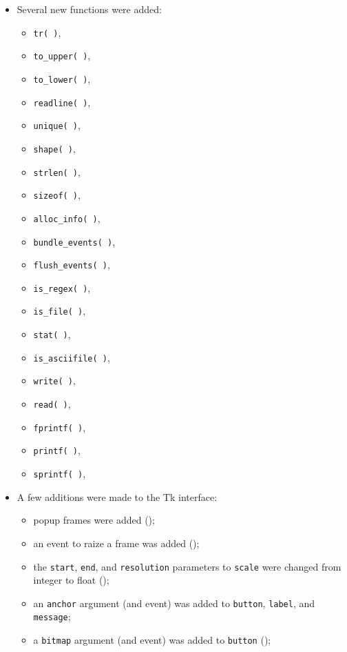 \begin{itemize}
\item Several new functions were added:
\begin{itemize}
\item {\tt tr( )}, 
\item {\tt to\_upper( )}, 
\item {\tt to\_lower( )}, 
\item {\tt readline( )}, 
\item {\tt unique( )}, 
\item {\tt shape( )}, 
\item {\tt strlen( )}, 
\item {\tt sizeof( )}, 
\item {\tt alloc\_info( )}, 
\item {\tt bundle\_events( )}, 
\item {\tt flush\_events( )}, 
\item {\tt is\_regex( )}, 
\item {\tt is\_file( )}, 
\item {\tt stat( )}, 
\item {\tt is\_asciifile( )}, 
\item {\tt write( )}, 
\item {\tt read( )}, 
\item {\tt fprintf( )}, 
\item {\tt printf( )}, 
\item {\tt sprintf( )}, 
\end{itemize}

\item A few additions were made to the Tk interface:
\begin{itemize}
\item popup frames were added ();
\item an event to raize a frame was added ();
\item the {\tt start}, {\tt end}, and {\tt resolution} parameters
      to {\tt scale} were changed from integer to float ();
\item an {\tt anchor} argument (and event) was added to {\tt button},
      {\tt label}, and {\tt message};
\item a {\tt bitmap} argument (and event) was added to {\tt button}
      ();
\end{itemize}

\end{itemize}


